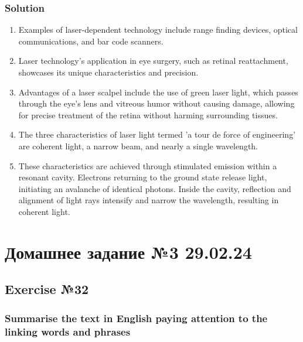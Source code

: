 \subsection*{Solution}
\begin{enumerate}
      \item Examples of laser-dependent technology include range finding devices,
            optical communications, and bar code scanners.
      \item Laser technology's application in eye surgery, such as retinal reattachment,
            showcases its unique characteristics and precision.
      \item Advantages of a laser scalpel include the use of green laser light, which
            passes through the eye's lens and vitreous humor without causing damage,
            allowing for precise treatment of the retina without harming surrounding
            tissues.
      \item The three characteristics of laser light termed 'a tour de force of
            engineering' are coherent light, a narrow beam, and nearly a single
            wavelength.
      \item These characteristics are achieved through stimulated emission within a
            resonant cavity. Electrons returning to the ground state release light,
            initiating an avalanche of identical photons. Inside the cavity, reflection
            and alignment of light rays intensify and narrow the wavelength, resulting
            in coherent light.
\end{enumerate}

\chapter{Домашнее задание №3 29.02.24}

\section{Exercise №32}
\subsection*{Summarise the text in English paying attention to the linking words and
      phrases}

